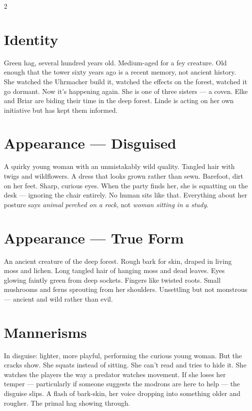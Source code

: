 \documentclass[10pt,letterpaper]{article}
\begin{document}
\begin{multicols}{2}

\section*{Identity}
Green hag, several hundred years old. Medium-aged for a fey creature. Old enough that the tower sixty years ago is a recent memory, not ancient history. She watched the Uhrmacher build it, watched the effects on the forest, watched it go dormant. Now it's happening again. She is one of three sisters --- a coven. Elke and Briar are biding their time in the deep forest. Linde is acting on her own initiative but has kept them informed.

\section*{Appearance --- Disguised}
A quirky young woman with an unmistakably wild quality. Tangled hair with twigs and wildflowers. A dress that looks grown rather than sewn. Barefoot, dirt on her feet. Sharp, curious eyes. When the party finds her, she is squatting on the desk --- ignoring the chair entirely. No human sits like that. Everything about her posture says \textit{animal perched on a rock}, not \textit{woman sitting in a study}.

\section*{Appearance --- True Form}
An ancient creature of the deep forest. Rough bark for skin, draped in living moss and lichen. Long tangled hair of hanging moss and dead leaves. Eyes glowing faintly green from deep sockets. Fingers like twisted roots. Small mushrooms and ferns sprouting from her shoulders. Unsettling but not monstrous --- ancient and wild rather than evil.

\section*{Mannerisms}
In disguise: lighter, more playful, performing the curious young woman. But the cracks show. She squats instead of sitting. She can't read and tries to hide it. She watches the players the way a predator watches movement. If she loses her temper --- particularly if someone suggests the modrons are here to help --- the disguise slips. A flash of bark-skin, her voice dropping into something older and rougher. The primal hag showing through.


\end{multicols}
\end{document}

